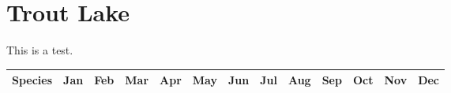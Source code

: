 \documentclass[8pt,letterpaper,notumble,foldmark]{leaflet}
\begin{document}
\selectfont

\section{Trout Lake}

This is a test.

\newpage

\linespread{0}

{\footnotesize
\tabcolsep=0.005cm

\begin{longtable}{|l|llllllllllllllllllllllllllllllllllllllllllllllll|}
\hline
Species & \multicolumn{4}{c}{Jan} & \multicolumn{4}{c}{Feb} & \multicolumn{4}{c}{Mar} &
\multicolumn{4}{c}{Apr} & \multicolumn{4}{c}{May} & \multicolumn{4}{c}{Jun} &
\multicolumn{4}{c}{Jul} & \multicolumn{4}{c}{Aug} & \multicolumn{4}{c}{Sep} &
\multicolumn{4}{c}{Oct} & \multicolumn{4}{c}{Nov} & \multicolumn{4}{c}{Dec} \\
\hline
\endhead



\hline
\end{longtable}
}
\end{document}
